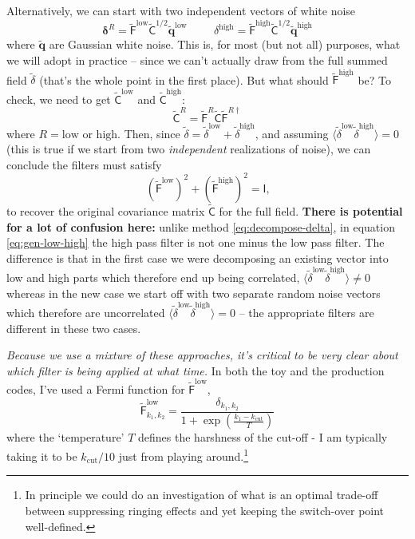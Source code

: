 \documentclass[11pt,a4paper,preprint]{aastex}
\newcommand{\low}{\mathrm{low}}
\newcommand{\high}{\mathrm{high}}
\newcommand{\bmath}[1]{\ensuremath{\bm{#1}}}
\renewcommand{\vec}[1]{\bmath{#1}}
\begin{document}
Alternatively, we can start with two independent vectors of white noise
\begin{equation}
\vec{\delta}^R = \tilde{\mathsf{F}}^{\low} \tilde{\mathsf{C}}^{1/2} \tilde{\vec{q}}^{\low} \hspace{1cm} \delta^{\high} = \tilde{\mathsf{F}}^{\high} \tilde{\mathsf{C}}^{1/2} \tilde{\vec{q}}^{\high}\label{eq:gen-low-high}
\end{equation}
where $\tilde{\vec{q}}$ are Gaussian white
noise. This is, for most (but not all) purposes, what we will adopt in practice -- since
we can't actually draw from the full summed field $\tilde{\delta}$ (that's the whole point in the first place).
But what should $\tilde{\mathsf{F}}^{\high}$ be? To check, we need to
get $\tilde{\mathsf{C}}^{\low}$ and $\tilde{\mathsf{C}}^{\high}$:
\begin{equation}
\tilde{\mathsf{C}}^R = \tilde{\mathsf{F}}^R \tilde{\mathsf{C}} \tilde{\mathsf{F}}^{R\dagger}
\end{equation}
where $R=\low$ or $\high$. Then, since $\tilde{\delta} = \tilde{\delta}^{\low} + \tilde{\delta}^{\high}$,
and assuming $\langle \tilde{\delta}^{\low} \tilde{\delta}^{\high}\rangle = 0$ (this is true if we start
from two {\it independent} realizations of noise), we can conclude the filters must satisfy
\begin{equation}
(\tilde{\mathsf{F}}^{\low})^2+ (\tilde{\mathsf{F}}^{\high})^2 = \mathsf{I}\textrm{,}
\end{equation}
to recover the original covariance matrix $\tilde{\mathsf{C}}$ for the full
field. {\bf There is  potential for a lot of confusion here: } unlike method \eqref{eq:decompose-delta},
in equation \eqref{eq:gen-low-high}  the high pass filter
is not one minus the low pass filter. The difference is that in the first case
we were decomposing an existing vector into low and high parts which therefore end
up being correlated, $\langle \tilde{\delta}^{\low} \tilde{\delta}^{\high} \rangle \ne 0$ whereas in the
new case we start off with two separate random noise vectors which therefore are
uncorrelated  $\langle \tilde{\delta}^{\low} \tilde{\delta}^{\high} \rangle = 0$  -- the appropriate
filters are different in these two cases.

{\it Because we use a mixture of these
approaches, it's critical to be very clear about which filter is being
applied at what time.} In both the toy and the production codes, I've used
a Fermi function for $\tilde{\mathsf{F}}^{\low}$,
\begin{equation}
  \tilde{\mathsf{F}}^{\low}_{k_1, k_2}=\frac{\delta_{k_1,k_2}}{1+\exp\left(\frac{k_1-k_{\mathrm{cut}}}{T}\right)}
\end{equation}
where the `temperature' $T$ defines the harshness of the cut-off - I am typically
taking it to be $k_{\mathrm{cut}}/10$ just from playing around.\footnote{In principle
we could do an investigation of what is an optimal trade-off between
suppressing ringing effects and yet keeping the switch-over point well-defined.}
\end{document}
